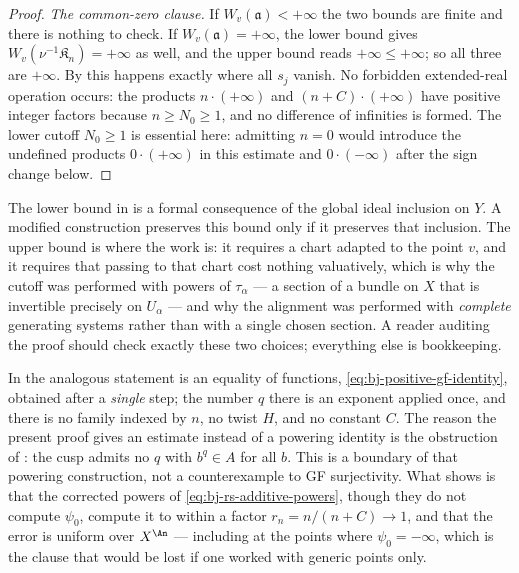 \begin{proof}
\emph{The common-zero clause.}  If $W_v(\mathfrak a)<+\infty$ the two
bounds are finite and there is nothing to check.  If
$W_v(\mathfrak a)=+\infty$, the lower bound gives
$W_v(\nu^{-1}\mathfrak K_n)=+\infty$ as well, and the upper bound reads
$+\infty\le+\infty$; so all three are $+\infty$.  By
 this happens exactly where all $s_j$
vanish.  No forbidden extended-real operation occurs: the products
$n\cdot(+\infty)$ and $(n+C)\cdot(+\infty)$ have positive integer
factors because $n\ge N_0\ge1$, and no difference of infinities is
formed.  The lower cutoff $N_0\ge1$ is essential here: admitting $n=0$
would introduce the undefined products $0\cdot(+\infty)$ in this estimate
and $0\cdot(-\infty)$ after the sign change below.
\end{proof}

\begin{remark}
\label{rem:ch44-two-halves}
The lower bound in  is a formal consequence
of the global ideal inclusion on $Y$.  A modified construction
preserves this bound only if it preserves that inclusion.  The upper bound is where the work is: it
requires a chart adapted to the point $v$, and it requires that passing to
that chart cost nothing valuatively, which is why the cutoff was performed
with powers of $\tau_\alpha$ --- a section of a bundle on $X$ that is
invertible precisely on $U_\alpha$ --- and why the alignment was performed
with \emph{complete} generating systems rather than with a single chosen
section.  A reader auditing the proof should check exactly these two
choices; everything else is bookkeeping.
\end{remark}

\begin{remark}
\label{rem:ch44-compare-frobenius}
In  the analogous statement is an
equality of functions,
\eqref{eq:bj-positive-gf-identity}, obtained after a \emph{single} step; the
number $q$ there is an exponent applied once, and there is no family
indexed by $n$, no twist $H$, and no constant $C$.  The reason the
present proof gives an estimate instead of a powering identity is the
obstruction of : the cusp admits no
$q$ with $b^q\in A$ for all $b$.  This is a boundary of that
powering construction, not a counterexample to GF surjectivity.  What
 shows is that the corrected powers of
\eqref{eq:bj-rs-additive-powers}, though they do not compute $\psi_0$,
compute it to within a factor $r_n=n/(n+C)\to1$, and that the error is
uniform over $X^{\An}$ --- including at the points where $\psi_0=-\infty$,
which is the clause that would be lost if one worked with generic points
only.
\end{remark}

